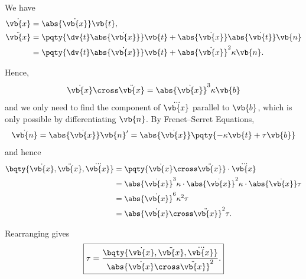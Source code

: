 \documentclass{article}
\begin{document}
We have
\begin{align*}
    \dot{\vb{x}} &= \abs{\dot{\vb{x}}} \vb{t}, \\
    \ddot{\vb{x}} &= \pqty{\dv{t} \abs{\dot{\vb{x}}}} \vb{t} + \abs{\dot{\vb{x}}} \abs{\dot{\vb{t}}} \vb{n} \\
    &= \pqty{\dv{t} \abs{\dot{\vb{x}}}} \vb{t} + \abs{\dot{\vb{x}}}^2 \kappa \vb{n}.
\end{align*}

Hence,
\[
    \dot{\vb{x}} \cross \ddot{\vb{x}} = \abs{\dot{\vb{x}}}^3 \kappa \vb{b}
\]
and we only need to find the component of \(\dddot{\vb{x}}\) parallel to \(\vb{b}\), which is only possible by differentiating \(\vb{n}\). By Frenet--Serret Equations,
\[
    \dot{\vb{n}} = \abs{\dot{\vb{x}}} \vb{n}' = \abs{\dot{\vb{x}}} \pqty{- \kappa \vb{t} + \tau \vb{b}}
\]
and hence
\begin{align*}
    \bqty{\dot{\vb{x}}, \ddot{\vb{x}}, \dddot{\vb{x}}} &= \pqty{\dot{\vb{x}} \cross \ddot{\vb{x}}} \cdot \dddot{\vb{x}} \\
    &= \abs{\dot{\vb{x}}}^3 \kappa \cdot \abs{\dot{\vb{x}}}^2 \kappa \cdot \abs{\dot{\vb{x}}} \tau \\
    &= \abs{\dot{\vb{x}}}^6 \kappa^2 \tau \\
    &= \abs{\dot{\vb{x}} \cross \ddot{\vb{x}}}^2 \tau.
\end{align*}

Rearranging gives
\[
    \boxed{\tau = \frac{\bqty{\dot{\vb{x}}, \ddot{\vb{x}}, \dddot{\vb{x}}}}{\abs{\dot{\vb{x}} \cross \ddot{\vb{x}}}^2}.}
\]
\end{document}
